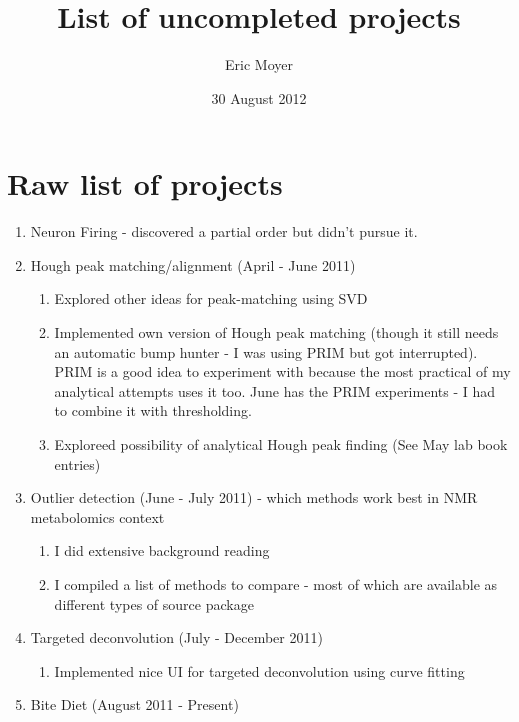 \documentclass[english]{article}
\begin{document}
\title{List of uncompleted projects}


\author{Eric Moyer}


\date{30 August 2012}

\maketitle

\section{Raw list of projects}

\begin{enumerate}
\item Neuron Firing - discovered a partial order but didn't pursue it.
\item Hough peak matching/alignment (April - June 2011)
      \begin{enumerate}
      \item Explored other ideas for peak-matching using SVD
      \item Implemented own version of Hough peak matching (though it still needs 
            an automatic bump hunter - I was using PRIM but got interrupted). 
            PRIM is a good idea to experiment with because the most practical of
            my analytical attempts uses it too. June has the PRIM experiments - 
            I had to combine it with thresholding.
      \item Exploreed possibility of analytical Hough peak finding 
            (See May lab book entries)
      \end{enumerate}
\item Outlier detection (June - July 2011) - which methods work best in NMR
      metabolomics context
      \begin{enumerate}
      \item I did extensive background reading
      \item I compiled a list of methods to compare - most of which are available
            as different types of source package
      \end{enumerate}
\item Targeted deconvolution (July - December 2011)
      \begin{enumerate}
      \item Implemented nice UI for targeted deconvolution using curve fitting
      \end{enumerate}
\item Bite Diet (August 2011 - Present)

\end{enumerate}
\end{document}
